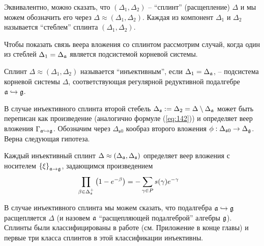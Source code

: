\documentclass[14pt,autoref,href,facsimile
]{disser}
\begin{document}
Эквивалентно, можно сказать, что  $(\Delta_1,\Delta_2)$  -- ``сплинт'' (расщепление)  $\Delta$ и мы можем обозначить его через $\Delta \approx (\Delta_1,\Delta_2)$. Каждая из компонент  $\Delta_1$ и $\Delta_2$ называется ``стеблем'' сплинта $(\Delta_1,\Delta_2)$.

Чтобы показать связь веера вложения со сплинтом рассмотрим случай, когда один из стеблей $\Delta _{1}=\Delta _{\mathfrak{a}}$  является подсистемой корневой системы. 

Сплинт $\Delta \approx (\Delta _{1},\Delta _{2})$ называется ``инъективным'', если $\Delta _{1}=\Delta _{\mathfrak{a}}$, -- подсистема корневой системы $\Delta $, соответствующая регулярной редуктивной подалгебре $\mathfrak{a}\hookrightarrow \mathfrak{g}$. 

В случае инъективного сплинта второй стебель $\Delta _{\mathfrak{s}}:=\Delta_{2}=\Delta \setminus \Delta _{\mathfrak{a}}$ может быть переписан как произведение (аналогично формуле (\ref{eq:142})) и определяет веер вложения  $\Gamma _{\mathfrak{a}\hookrightarrow \mathfrak{g}}$. Обозначим через $\Delta_{\mathfrak{s}0}$ кообраз второго вложения $\phi:\Delta_{\mathfrak{s}0}\to \Delta_{\mathfrak{g}}$. Верна следующая гипотеза.

\begin{conjecture}
Каждый инъективный сплинт $\Delta \approx (\Delta _{\mathfrak{a}},\Delta _{\mathfrak{s}})$ определяет веер вложения с носителем $\left\{ \xi \right\} _{\mathfrak{a}\rightarrow \mathfrak{g}}$, задающимся произведением
\begin{equation}
\prod_{\beta \in \Delta _{\mathfrak{s}}^{+}}\left( 1-e^{-\beta }\right)
=-\sum_{\gamma \in P}s(\gamma )e^{-\gamma }\quad   \label{splint product}
\end{equation}
\end{conjecture}

В случае инъективного сплинта мы можем сказать, что подалгебра $\mathfrak{a}\hookrightarrow \mathfrak{g}$ расщепляется $\Delta$ (и назовем $\mathfrak{a}$ ``расщепляющей подалгеброй'' алгебры $\mathfrak{g}$).  Сплинты были классифицированы в работе \cite{richter2008splints}  (см. Приложение в конце главы) и первые три класса сплинтов в этой классификации инъективны. 
\end{document}
